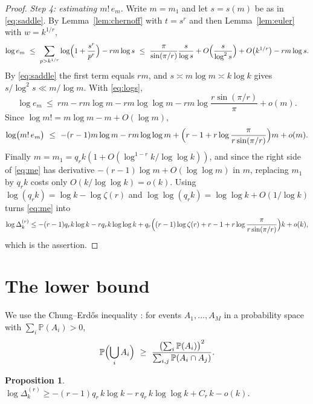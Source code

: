 \documentclass[10pt,a4paper]{amsart}
\newtheorem{proposition}[theorem]{Proposition}
\numberwithin{equation}{section}
\begin{document}
\begin{proof}
\smallskip
\emph{Step 4: estimating $m!\,e_m$.}
Write $m=m_1$ and let $s=s(m)$ be as in \eqref{eq:saddle}. By Lemma~\ref{lem:chernoff} with
$t=s^{r}$ and then Lemma~\ref{lem:euler} with $w=k^{1/r}$,
\[
  \log e_m\ \le\ \sum_{p>k^{1/r}}\log\Bigl(1+\frac{s^{r}}{p^{r}}\Bigr)-rm\log s
  \ \le\ \frac{\pi}{\sin(\pi/r)}\frac{s}{\log s}+O\Bigl(\frac{s}{\log^{2}s}\Bigr)
  +O\bigl(k^{1/r}\bigr)-rm\log s .
\]
By \eqref{eq:saddle} the first term equals $rm$, and $s\asymp m\log m\asymp k\log k$ gives
$s/\log^{2}s\ll m/\log m$. With \eqref{eq:logs},
\[
  \log e_m\ \le\ rm-rm\log m-rm\log\log m-rm\log\frac{r\sin(\pi/r)}{\pi}+o(m).
\]
Since $\log m!=m\log m-m+O(\log m)$,
\begin{equation}\label{eq:me}
  \log\bigl(m!\,e_m\bigr)\ \le\ -(r-1)m\log m-rm\log\log m
  +\Bigl(r-1+r\log\frac{\pi}{r\sin(\pi/r)}\Bigr)m+o(m).
\end{equation}
Finally $m=m_1=q_rk(1+O(\log^{1-r}k/\log\log k))$, and since the right side of
\eqref{eq:me} has derivative $-(r-1)\log m+O(\log\log m)$ in $m$, replacing $m_1$ by $q_rk$
costs only $O(k/\log\log k)=o(k)$. Using
$\log(q_rk)=\log k-\log\zeta(r)$ and $\log\log(q_rk)=\log\log k+O(1/\log k)$ turns
\eqref{eq:me} into
\[
  \log\Delta^{(r)}_k\le-(r-1)q_rk\log k-rq_rk\log\log k
  +q_r\Bigl((r-1)\log\zeta(r)+r-1+r\log\frac{\pi}{r\sin(\pi/r)}\Bigr)k+o(k),
\]
which is the assertion.
\end{proof}

\section{The lower bound}\label{sec:lower}

We use the Chung--Erd\H{o}s inequality \cite{ChungErdos}: for events $A_1,\dots,A_M$ in a
probability space with $\sum_i\mathbb P(A_i)>0$,
\begin{equation}\label{eq:CE}
  \mathbb P\Bigl(\bigcup_iA_i\Bigr)\ \ge\
  \frac{\bigl(\sum_i\mathbb P(A_i)\bigr)^{2}}{\sum_{i,j}\mathbb P(A_i\cap A_j)} .
\end{equation}

\begin{proposition}\label{prop:lower}
$\log\Delta^{(r)}_k\ge-(r-1)q_r\,k\log k-r\,q_r\,k\log\log k+C_r\,k-o(k)$.
\end{proposition}
\end{document}
